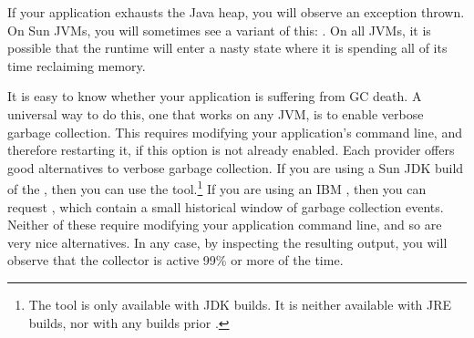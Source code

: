 If your application exhausts the Java heap, you will observe an
 exception thrown. On
Sun JVMs, you will sometimes see a variant of this: . On all JVMs, it is possible that
the runtime will enter a nasty state where it is spending all of its time
reclaiming memory.


It is easy to know whether your application is suffering from GC death. A
universal way to do this, one that works on any JVM, is to enable verbose
garbage collection. This requires modifying
your application's command line, and therefore restarting it, if this option is
not already enabled. Each \jre provider offers good alternatives to verbose
garbage collection. If you are using a Sun JDK build of the \jre, then you can
use the  tool.\footnote{The  tool
is only available with JDK builds. It is neither available with JRE builds, nor
with any builds prior \javafive.} If you are using an IBM \jre, then you can
request , which contain a small historical window of  garbage
collection events. Neither of these require modifying your
application command line, and so are very nice alternatives. In any case, by
inspecting the resulting output, you will observe that the collector is active
99\% or more of the time.






